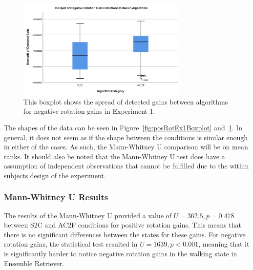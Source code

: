 \begin{figure}[tbph]
    \centering
    \includegraphics[width=0.75\textwidth]{figures/graphs/NegRotationDetectionBoxplot.png}
    \caption[Boxplot on Negative Rotation Detections in Experiment 1]{This boxplot shows the spread of detected gains between algorithms for negative rotation gains in Experiment 1.}
    \label{fig:negRotEx1Boxplot}
\end{figure}

The shapes of the data can be seen in Figure~\ref{fig:posRotEx1Boxplot} and~\ref{fig:negRotEx1Boxplot}. In general, it does not seem as if the shape between the conditions is similar enough in either of the cases. As such, the Mann-Whitney U comparison will be on mean ranks. It should also be noted that the Mann-Whitney U test does have a assumption of independent observations that cannot be fulfilled due to the within subjects design of the experiment.

\subsubsection{Mann-Whitney U Results}
The results of the Mann-Whitney U provided a value of $U = 362.5, p = 0.478$ between S2C and AC2F conditions for positive rotation gains. This means that there is no significant differences between the states for these gains. For negative rotation gains, the statistical test resulted in $U = 1639, p < 0.001$, meaning that it is significantly harder to notice negative rotation gains in the walking state in Ensemble Retriever.

